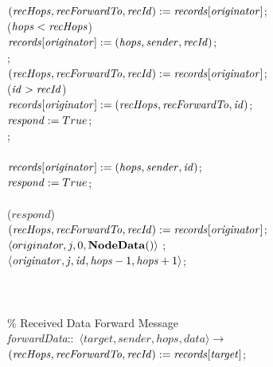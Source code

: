 \begin{figure}[H]
\begin{boxedminipage}{\linewidth}
    \null\qq\qq\qq\qq $(\mbox{\emph{recHops}}, \mbox{\emph{recForwardTo}}, \mbox{\emph{recId}}) \mathrel{:=} \mbox{\emph{records}}[\mbox{\emph{originator}}]$;\\
    \null\qq\qq\qq\qq {} ($\mbox{\emph{hops}} < \mbox{\emph{recHops}}$) \\
    \null\qq\qq\qq\qq\qq $\mbox{\emph{records}}[\mbox{\emph{originator}}] \mathrel{:=} (\mbox{\emph{hops}}, \mbox{\emph{sender}}, \mbox{\emph{recId}})$;\\
    \null\qq\qq\qq\qq {}; \\
    \null\qq\qq\qq\qq $(\mbox{\emph{recHops}}, \mbox{\emph{recForwardTo}}, \mbox{\emph{recId}}) \mathrel{:=} \mbox{\emph{records}}[\mbox{\emph{originator}}]$;\\
    \null\qq\qq\qq\qq {} ($\mbox{\emph{id}} > \mbox{\emph{recId}}$) \\
    \null\qq\qq\qq\qq\qq $\mbox{\emph{records}}[\mbox{\emph{originator}}] \mathrel{:=} (\mbox{\emph{recHops}}, \mbox{\emph{recForwardTo}}, \mbox{\emph{id}})$;\\
    \null\qq\qq\qq\qq\qq $\mbox{\emph{respond}} \mathrel{:=} True$;\\
    \null\qq\qq\qq\qq {}; \\
    \null\qq\qq\qq {}\\
    \null\qq\qq\qq\qq $\mbox{\emph{records}}[\mbox{\emph{originator}}] \mathrel{:=} (\mbox{\emph{hops}}, \mbox{\emph{sender}}, \mbox{\emph{id}})$;\\
    \null\qq\qq\qq\qq $\mbox{\emph{respond}} \mathrel{:=} True$;\\
    \null\qq\qq\qq {}\\
    \null\qq\qq\qq {} ($respond$)\\
    \null\qq\qq\qq\qq $(\mbox{\emph{recHops}}, \mbox{\emph{recForwardTo}}, \mbox{\emph{recId}}) \mathrel{:=} \mbox{\emph{records}}[\mbox{\emph{originator}}]$;\\
    \null\qq\qq\qq\qq {}$\langle originator, j, 0, \mbox{\textbf{NodeData}}() \rangle$  ;\\
    \null\qq\qq\qq\qq {}$\langle \mbox{\emph{originator}}, \mbox{\emph{j}}, \mbox{\emph{id}}, \mbox{\emph{hops}} - 1, \mbox{\emph{hops}} + 1\rangle$;\\
    \null\qq\qq\qq {}\\
    \null\qq\qq {}\\~\\
    \null\qq \% Received Data Forward Message\\
    \null\qq \emph{forwardData}::~$\langle target, sender, hops, data\rangle \rightarrow$\\
    \null\qq\qq $(\mbox{\emph{recHops}}, \mbox{\emph{recForwardTo}}, \mbox{\emph{recId}}) \mathrel{:=} \mbox{\emph{records}}[\mbox{\emph{target}}]$;\\

\end{boxedminipage}
\end{figure}
